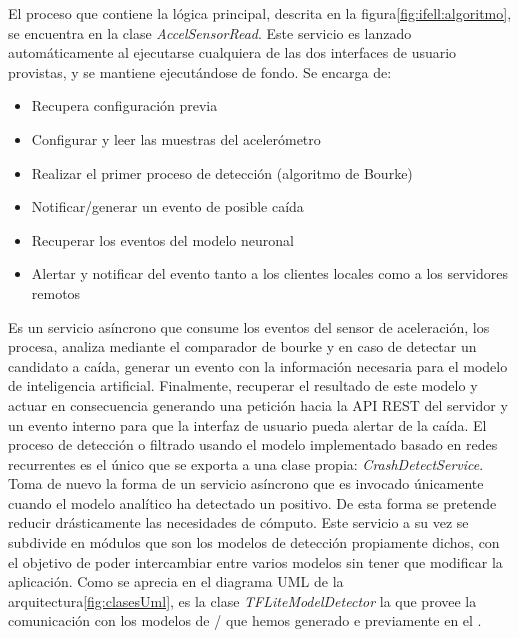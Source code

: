 
El proceso que contiene la lógica principal, descrita en la figura\ref{fig:ifell:algoritmo}, se encuentra en la clase \textit{AccelSensorRead}. Este servicio es lanzado automáticamente al ejecutarse cualquiera de las dos interfaces de usuario provistas, y se mantiene ejecutándose de fondo. Se encarga de:

\begin{itemize}
  \item Recupera configuración previa
  \item Configurar y leer las muestras del acelerómetro
  \item Realizar el primer proceso de detección (algoritmo de Bourke)
  \item Notificar/generar un evento de posible caída
  \item Recuperar los eventos del modelo neuronal
  \item Alertar y notificar del evento tanto a los clientes locales como a los servidores remotos
\end{itemize}


Es un servicio asíncrono que consume los eventos del sensor de aceleración, los procesa, analiza mediante el comparador de bourke y en caso de detectar un candidato a caída, generar un evento con la información necesaria para el modelo de inteligencia artificial. Finalmente, recuperar el resultado de este modelo y actuar en consecuencia generando una petición hacia la API REST del servidor y un evento interno para que la interfaz de usuario pueda alertar de la caída.
El proceso de detección o filtrado usando el modelo implementado basado en redes recurrentes es el único que se exporta a una clase propia: \textit{CrashDetectService}. Toma de nuevo la forma de un servicio asíncrono que es invocado únicamente cuando el modelo analítico ha detectado un positivo. De esta forma se pretende reducir drásticamente las necesidades de cómputo. Este servicio a su vez se subdivide en módulos que son los modelos de detección propiamente dichos, con el objetivo de poder intercambiar entre varios modelos sin tener que modificar la aplicación. Como se aprecia en el diagrama UML de la arquitectura\ref{fig:clasesUml}, es la clase \textit{TFLiteModelDetector} la que provee la comunicación con los modelos de \tflite/ que hemos generado e previamente en el . 


